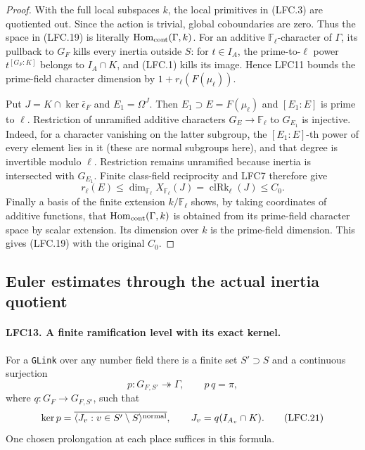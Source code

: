 \begin{proof}
With the full local subspaces \(k\), the local primitives
in (LFC.3) are quotiented out.  Since the action is trivial,
global coboundaries are zero.  Thus the space in (LFC.19)
is literally \(\operatorname{Hom}_{\rm cont}(\Gamma,k)\).
For an additive \(\mathbb F_\ell\)-character of \(\Gamma\),
its pullback to \(G_F\) kills every inertia outside \(S\):
for \(t\in I_A\), the prime-to-\(\ell\) power
\(t^{[G_F:K]}\) belongs to \(I_A\cap K\), and (LFC.1)
kills its image.  Hence LFC11 bounds the prime-field
character dimension by \(1+r_\ell(F(\mu_\ell))\).

Put \(J=K\cap\ker\bar\epsilon_F\) and \(E_1=\Omega^J\).
Then \(E_1\supset E=F(\mu_\ell)\) and \([E_1:E]\)
is prime to \(\ell\).
Restriction of unramified additive characters
\(G_E\to\mathbb F_\ell\) to \(G_{E_1}\) is injective.
Indeed, for a character vanishing on the latter subgroup,
the \([E_1:E]\)-th power of every element lies in it
(these are normal subgroups here), and that degree is
invertible modulo \(\ell\).
Restriction remains unramified because inertia is
intersected with \(G_{E_1}\).
Finite class-field reciprocity and LFC7 therefore give
\[
 r_\ell(E)\le\dim_{\mathbb F_\ell}X_{\mathbb F_\ell}(J)
             =\operatorname{clRk}_\ell(J)\le C_0.
 \]
Finally a basis of the finite extension \(k/\mathbb F_\ell\)
shows, by taking coordinates of additive functions, that
\(\operatorname{Hom}_{\rm cont}(\Gamma,k)\) is obtained
from its prime-field character space by scalar extension.
Its dimension over \(k\) is the prime-field dimension.
This gives (LFC.19) with the original \(C_0\).
\end{proof}

\subsection{Euler estimates through the actual inertia quotient}

\paragraph{LFC13. A finite ramification level with its exact kernel.}
\label{claim:LFC13}
For a \texttt{GLink} over any number field there is a
finite set \(S'\supset S\)
and a continuous surjection
\[
 p:G_{F,S'}\twoheadrightarrow\Gamma,\qquad p\,q=\pi,
                                                        \tag{LFC.20}
\]
where \(q:G_F\to G_{F,S'}\), such that
\[
 \ker p=\overline{\langle J_v:v\in S'\setminus S
                                      \rangle^{\rm normal}},
 \qquad J_v=q(I_{A_v}\cap K).                            \tag{LFC.21}
\]
One chosen prolongation at each place suffices in this formula.

